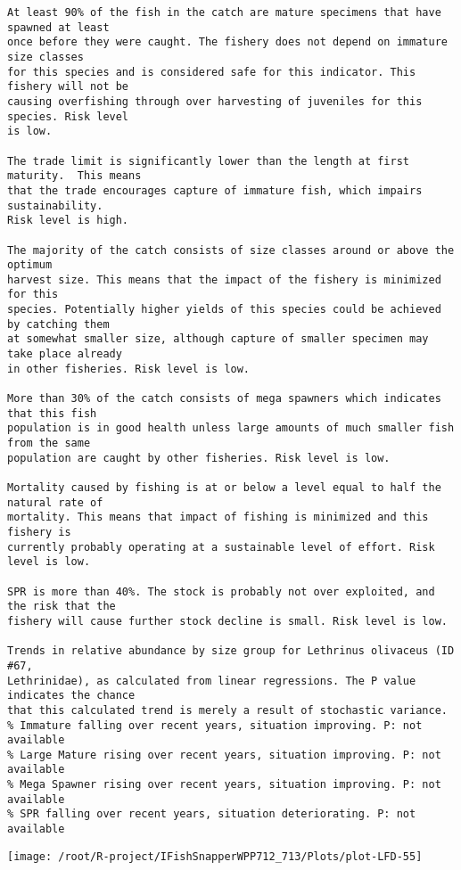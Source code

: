 \documentclass{report}\usepackage[]{graphicx}\usepackage[]{color}
\makeatletter
\def\maxwidth{ %
  \ifdim\Gin@nat@width>\linewidth
    \linewidth
  \else
    \Gin@nat@width
  \fi
}
\newenvironment{kframe}{%
 \def\at@end@of@kframe{}%
 \ifinner\ifhmode%
  \def\at@end@of@kframe{\end{minipage}}%
  \begin{minipage}{\columnwidth}%
 \fi\fi%
 \def\FrameCommand##1{\hskip\@totalleftmargin \hskip-\fboxsep
 \colorbox{shadecolor}{##1}\hskip-\fboxsep
     \hskip-\linewidth \hskip-\@totalleftmargin \hskip\columnwidth}%
 \MakeFramed {\advance\hsize-\width
   \@totalleftmargin\z@ \linewidth\hsize
   \@setminipage}}%
 {\par\unskip\endMakeFramed%
 \at@end@of@kframe}
\newenvironment{knitrout}{}{} %
\makeatother
\begin{document}
\begin{knitrout}
\begin{kframe}
\begin{verbatim}
At least 90% of the fish in the catch are mature specimens that have spawned at least
once before they were caught. The fishery does not depend on immature size classes
for this species and is considered safe for this indicator. This fishery will not be
causing overfishing through over harvesting of juveniles for this species. Risk level
is low.

The trade limit is significantly lower than the length at first maturity.  This means
that the trade encourages capture of immature fish, which impairs sustainability.
Risk level is high.

The majority of the catch consists of size classes around or above the optimum
harvest size. This means that the impact of the fishery is minimized for this
species. Potentially higher yields of this species could be achieved by catching them
at somewhat smaller size, although capture of smaller specimen may take place already
in other fisheries. Risk level is low.

More than 30% of the catch consists of mega spawners which indicates that this fish
population is in good health unless large amounts of much smaller fish from the same
population are caught by other fisheries. Risk level is low.
 
Mortality caused by fishing is at or below a level equal to half the natural rate of
mortality. This means that impact of fishing is minimized and this fishery is
currently probably operating at a sustainable level of effort. Risk level is low.
 
SPR is more than 40%. The stock is probably not over exploited, and the risk that the
fishery will cause further stock decline is small. Risk level is low.
 
Trends in relative abundance by size group for Lethrinus olivaceus (ID #67,
Lethrinidae), as calculated from linear regressions. The P value indicates the chance
that this calculated trend is merely a result of stochastic variance.
% Immature falling over recent years, situation improving. P: not available
% Large Mature rising over recent years, situation improving. P: not available
% Mega Spawner rising over recent years, situation improving. P: not available
% SPR falling over recent years, situation deteriorating. P: not available
\end{verbatim}
\end{kframe}
\texttt{[image: /root/R-project/IFishSnapperWPP712\_713/Plots/plot-LFD-55]} 
\begin{kframe}


\end{kframe}
\end{knitrout}
\end{document}
